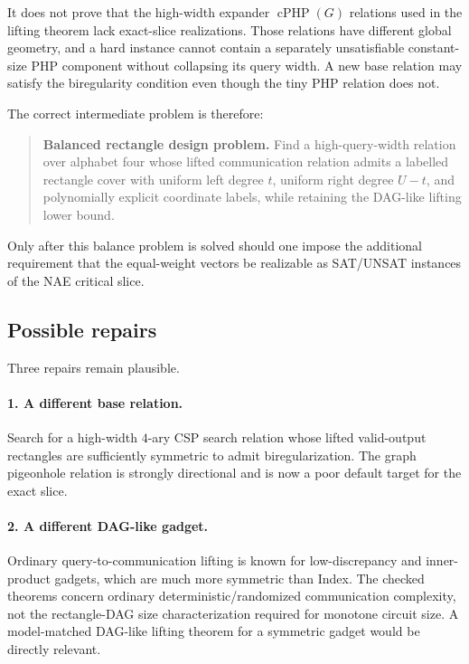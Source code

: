 \documentclass[11pt]{article}
\begin{document}
It does not prove that the high-width expander $\operatorname{cPHP}(G)$ relations used in the lifting theorem lack exact-slice realizations. Those relations have different global geometry, and a hard instance cannot contain a separately unsatisfiable constant-size PHP component without collapsing its query width. A new base relation may satisfy the biregularity condition even though the tiny PHP relation does not.

The correct intermediate problem is therefore:

\begin{quote}
\textbf{Balanced rectangle design problem.}
Find a high-query-width relation over alphabet four whose lifted communication relation admits a labelled rectangle cover with uniform left degree $t$, uniform right degree $U-t$, and polynomially explicit coordinate labels, while retaining the DAG-like lifting lower bound.
\end{quote}

Only after this balance problem is solved should one impose the additional requirement that the equal-weight vectors be realizable as SAT/UNSAT instances of the NAE critical slice.

\subsection{Possible repairs}
Three repairs remain plausible.

\paragraph{1. A different base relation.}
Search for a high-width $4$-ary CSP search relation whose lifted valid-output rectangles are sufficiently symmetric to admit biregularization. The graph pigeonhole relation is strongly directional and is now a poor default target for the exact slice.

\paragraph{2. A different DAG-like gadget.}
Ordinary query-to-communication lifting is known for low-discrepancy and inner-product gadgets, which are much more symmetric than Index. The checked theorems concern ordinary deterministic/randomized communication complexity, not the rectangle-DAG size characterization required for monotone circuit size. A model-matched DAG-like lifting theorem for a symmetric gadget would be directly relevant.
\end{document}

